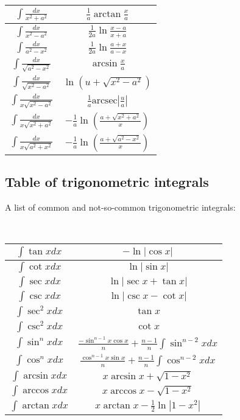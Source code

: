 \

\begin{tabular}{|c|c|}
    \hline
    $\int \frac{dx}{x^2 + a^2}$ & $\frac{1}{a} \arctan \frac{x}{a}$ \\ \hline
    $\int \frac{dx}{x^2 - a^2}$ & $\frac{1}{2a} \ln \frac{x - a}{x + a}$ \\ \hline
    $\int \frac{dx}{a^2 - x^2}$ & $\frac{1}{2a} \ln \frac{a + x}{a - x}$ \\ \hline
    $\int \frac{dx}{\sqrt{a^2 - x^2}}$ & $\arcsin \frac{x}{a}$ \\ \hline
    $\int \frac{dx}{\sqrt{x^2 - a^2}}$ & $\ln \left(u + \sqrt{x^2 - a^2}\right)$ \\ \hline
    $\int \frac{dx}{x \sqrt{x^2 - a^2}}$ & $\frac{1}{a} \text{arcsec} \left| \frac{u}{a} \right|$ \\ \hline
    $\int \frac{dx}{x \sqrt{x^2 + a^2}}$ & $-\frac{1}{a} \ln \left( \frac{a + \sqrt{x^2 + a^2}}{x} \right)$ \\ \hline
    $\int \frac{dx}{x \sqrt{a^2 + x^2}}$ & $-\frac{1}{a} \ln \left( \frac{a + \sqrt{a^2 - x^2}}{x} \right)$ \\ \hline
\end{tabular}

\subsection{Table of trigonometric integrals}
A list of common and not-so-common trigonometric integrals:

\

\begin{tabular}{|c|c|}
    \hline
    $\int \tan x dx$ & $-\ln |\cos x|$ \\ \hline
    $\int \cot x dx$ & $\ln |\sin x|$ \\ \hline
    $\int \sec x dx$ & $\ln |\sec x + \tan x|$ \\ \hline
    $\int \csc x dx$ & $\ln |\csc x - \cot x|$ \\ \hline
    $\int \sec^2 x dx$ & $\tan x$ \\ \hline
    $\int \csc^2 x dx$ & $\cot x$ \\ \hline
    $\int \sin^n x dx$ & $\frac{-\sin^{n-1} x \cos x}{n} + \frac{n-1}{n}\int \sin^{n-2}x dx$ \\ \hline
    $\int \cos^n x dx$ & $\frac{\cos^{n-1} x \sin x}{n} + \frac{n-1}{n}\int \cos^{n-2}x dx$ \\ \hline
    $\int \arcsin x dx$ & $x \arcsin x + \sqrt{1 - x^2}$ \\ \hline
    $\int \arccos x dx$ & $x \arccos x - \sqrt{1 - x^2}$ \\ \hline
    $\int \arctan x dx$ & $x \arctan x - \frac{1}{2} \ln |1 - x^2|$ \\ \hline
\end{tabular}
